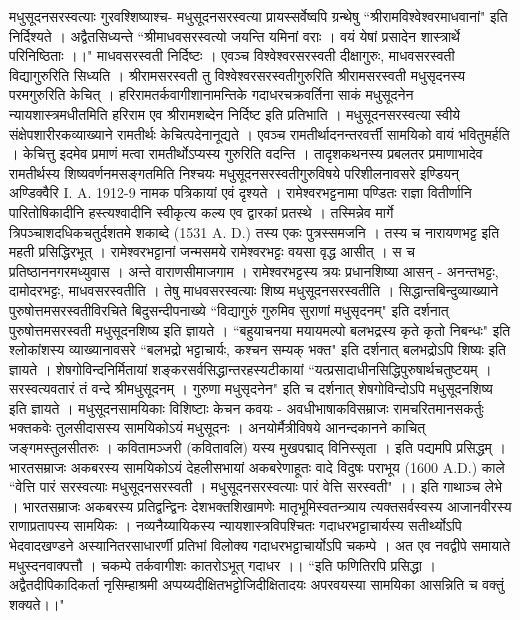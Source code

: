 मधुसूदनसरस्वत्याः गुरवश्शिष्याश्च-
मधुसूदनसरस्वत्या प्रायस्सर्वेष्वपि ग्रन्थेषु ``श्रीरामविश्वेश्वरमाधवानां" इति निर्दिश्यते । अद्वैतसिध्यन्ते
``श्रीमाधवसरस्वत्यो जयन्ति यमिनां वराः ।
वयं येषां प्रसादेन शास्त्रार्थे परिनिष्ठिताः ।।"
माधवसरस्वती निर्दिष्टः । एवञ्च विश्वेश्वरसरस्वती दीक्षागुरुः, माधवसरस्वती विद्यागुरुरिति सिध्यति । श्रीरामसरस्वती तु विश्वेश्वरसरस्वतीगुरुरिति श्रीरामसरस्वती मधुसृदनस्य परमगुरुरिति केचित् । हरिरामतर्कवागीशानामन्तिके गदाधरचक्रवर्तिना साकं मधुसूदनेन न्यायशास्त्रमधीतमिति हरिराम एव श्रीरामशब्देन निर्दिष्ट इति प्रतिभाति ।
मधुसूदनसरस्वत्या स्वीये संक्षेपशारीरकव्याख्याने रामतीर्थः केचित्पदेनानूद्यते । एवञ्च रामतीर्थादनन्तरवर्त्ती सामयिको वायं भवितुमर्हति । केचित्तु इदमेव प्रमाणं मत्वा रामतीर्थोऽप्यस्य गुरुरिति वदन्ति । तादृशकथनस्य प्रबलतर प्रमाणाभादेव रामतीर्थस्य शिष्यवर्णनमसङ्गतमिति निश्चयः
मधुसूदनसरस्वतीगुरुविषये परिशीलनावसरे इण्डियन् अण्डिक्वैरि I. A. 1912-9 नामक पत्रिकायां एवं दृश्यते ।
रामेश्वरभट्टनामा पण्डितः राज्ञा वितीर्णानि पारितोषिकादीनि हस्त्यश्वादीनि स्वीकृत्य कल्य एव द्वारकां प्रतस्थे । तस्मिन्नेव मार्गे त्रिपञ्चाशदधिकचतुर्दशतमे शकाब्दे (1531 A. D.) तस्य एकः पुत्रस्समजनि । तस्य च नारायणभट्ट इति महती प्रसिद्धिरभूत् । रामेश्वरभट्टानां जन्मसमये रामेश्वरभट्टः वयसा वृद्ध आसीत् । स च प्रतिष्ठाननगरमध्युवास । अन्ते वाराणसीमाजगाम । रामेश्वरभट्टस्य त्रयः प्रधानशिष्या आसन् - अनन्तभट्टः, दामोदरभट्टः, माधवसरस्वतीति । तेषु माधवसरस्वत्याः शिष्य मधुसूदनसरस्वतीति ।
सिद्धान्तबिन्दुव्याख्याने पुरुषोत्तमसरस्वतीविरचिते बिदुसन्दीपनाख्ये ``विद्यागुरुं गुरुमिव सुराणां मधुसृदनम्" इति दर्शनात् पुरुषोत्तमसरस्वती मधुसूदनशिष्य इति ज्ञायते । ``बहुयाचनया मयायमल्पो बलभद्रस्य कृते कृतो निबन्धः" इति श्लोकांशस्य व्याख्यानावसरे ``बलभद्रो भट्टाचार्यः, कश्चन सम्यक् भक्त" इति दर्शनात् बलभद्रोऽपि शिष्यः इति ज्ञायते । शेषगोविन्दनिर्मितायां शङ्करसर्वसिद्धान्तरहस्यटीकायां ``यत्प्रसादाधीनसिद्धिपुरुषार्थचतुष्टयम् । सरस्वत्यवतारं तं वन्दे श्रीमधुसूदनम् । गुरुणा मधुसृदनेन" इति च दर्शनात् शेषगोविन्दोऽपि मधुसूदनशिष्य इति ज्ञायते ।
मधुसूदनसामयिकाः विशिष्टाः केचन कवयः -
अवधीभाषाकविसम्राजः रामचरितमानसकर्तुः भक्तकवेः तुलसीदासस्य सामयिकोऽयं मधुसूदनः । अनयोर्मैत्रीविषये
आनन्दकानने काचित् जङ्गमस्तुलसीतरुः ।
कवितामञ्जरी (कवितावलि) यस्य मुखपद्माद् विनिस्सृता ।
इति पद्यमपि प्रसिद्धम् । भारतसम्राजः अकबरस्य सामयिकोऽयं देहलीसभायां अकबरेणाहूतः वादे विदुषः पराभूय (1600 A.D.) काले
``वेत्ति पारं सरस्वत्याः मधुसूदनसरस्वती ।
मधुसूदनसरस्वत्याः पारं वेत्ति सरस्वती" ।। इति 
गाथाञ्च लेभे । भारतसम्राजः अकबरस्य प्रतिद्वन्द्विनः देशभक्तशिखामणेः मातृभूमिस्वतन्त्र्याय त्यक्तसर्वस्वस्य आजानवीरस्य राणाप्रतापस्य सामयिकः । नव्यनैय्यायिकस्य न्यायशास्त्रविपश्चितः गदाधरभट्टाचार्यस्य सतीर्थ्योऽपि भेदवादखण्डने अस्यानितरसाधारर्णी प्रतिभां विलोक्य गदाधरभट्टाचार्योऽपि चकम्पे । अत एव नवद्वीपे समायाते मधुस्दनवाक्पत्तौ । चकम्पे तर्कवागीशः कातरोऽभूत् गदाधर ।। ``इति फणितिरपि प्रसिद्धा । अद्वैतदीपिकादिकर्ता नृसिम्हाश्रमी अप्पय्यदीक्षितभट्टोजिदीक्षितादयः अपरवयस्या सामयिका आसन्निति च वक्तुं शक्यते।।" 
